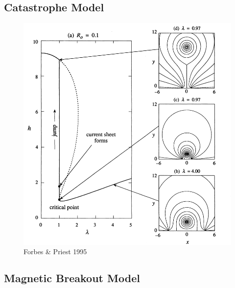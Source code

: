 \subsection{Catastrophe Model}\label{sec:20}
\begin{figure}[!t]
\begin{center}
\includegraphics[scale=0.5, trim=3cm 0cm 0cm 0cm]{images/catastrophe}
\caption{Forbes \& Priest 1995}
\label{fig:breakout_model}
\end{center}
\end{figure}
\clearpage

\subsection{Magnetic Breakout Model}\label{sec:21}


